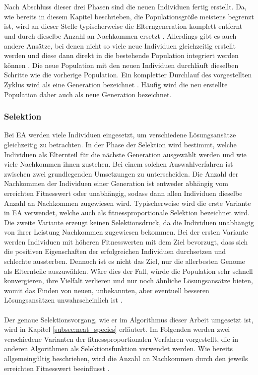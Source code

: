 \\\\
Nach Abschluss dieser drei Phasen sind die neuen Individuen fertig erstellt. Da, wie bereits in diesem Kapitel beschrieben, die Populationsgröße meistens begrenzt ist, wird an dieser Stelle typischerweise die Elterngeneration komplett entfernt und durch dieselbe Anzahl an Nachkommen ersetzt \cite{weicker2015evolutionare}. Allerdings gibt es auch andere Ansätze, bei denen nicht so viele neue Individuen gleichzeitig erstellt werden und diese dann direkt in die bestehende Population integriert werden können \cite{stanley2005real}. Die neue Population mit den neuen Individuen durchläuft dieselben Schritte wie die vorherige Population. Ein kompletter Durchlauf des vorgestellten Zyklus wird als eine Generation bezeichnet \cite{weicker2015evolutionare}. Häufig wird die neu erstellte Population daher auch als neue Generation bezeichnet. 

\subsubsection{Selektion}
\label{subsubsec:ea_selection}
Bei \ac{EA} werden viele Individuen eingesetzt, um verschiedene Lösungsansätze gleichzeitig zu betrachten. In der Phase der Selektion wird bestimmt, welche Individuen als Elternteil für die nächste Generation ausgewählt werden und wie viele Nachkommen ihnen zustehen. Bei einem solchen Auswahlverfahren ist zwischen zwei grundlegenden Umsetzungen zu unterscheiden. Die Anzahl der Nachkommen der Individuen einer Generation ist entweder abhängig vom erreichten Fitnesswert oder unabhängig, sodass dann allen Individuen dieselbe Anzahl an Nachkommen zugewiesen wird. Typischerweise wird die erste Variante in \ac{EA} verwendet, welche auch als fitnessproportionale Selektion bezeichnet wird. Die zweite Variante erzeugt keinen Selektionsdruck, da die Individuen unabhängig von ihrer Leistung Nachkommen zugewiesen bekommen. Bei der ersten Variante werden Individuen mit höheren Fitnesswerten mit dem Ziel bevorzugt, dass sich die positiven Eigenschaften der erfolgreichen Individuen durchsetzen und schlechte aussterben. Dennoch ist es nicht das Ziel, nur die allerbesten Genome als Elternteile auszuwählen. Wäre dies der Fall, würde die Population sehr schnell konvergieren, ihre Vielfalt verlieren und nur noch ähnliche Lösungsansätze bieten, womit das Finden von neuen, unbekannten, aber eventuell besseren Lösungsansätzen unwahrscheinlich ist \cite{weicker2015evolutionare}. 
\\\\
Der genaue Selektionsvorgang, wie er im Algorithmus dieser Arbeit umgesetzt ist, wird in Kapitel \ref{subsec:neat_species} erläutert. Im Folgenden werden zwei verschiedene Varianten der fitnessproportionalen Verfahren vorgestellt, die in anderen Algorithmen als Selektionsfunktion verwendet werden. Wie bereits allgemeingültig beschrieben, wird die Anzahl an Nachkommen durch den jeweils erreichten Fitnesswert beeinflusst \cite{weicker2015evolutionare}.


